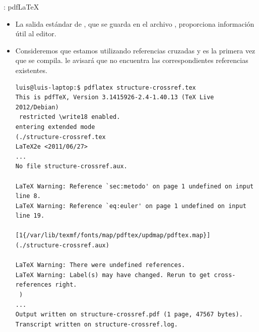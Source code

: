 \documentclass{beamer}
\begin{document}
\begin{frame}[fragile]{\insertsection: pdf\LaTeX{}}
  \begin{itemize}
  \item La salida estándar de , que se guarda en el
    archivo , proporciona información útil al editor. 
  \item Consideremos que estamos utilizando referencias cruzadas y es
    la primera vez que se compila.  le avisará que no
    encuentra las correspondientes referencias existentes.
    \begin{center}
      \begin{verbatim}
luis@luis-laptop:$ pdflatex structure-crossref.tex 
This is pdfTeX, Version 3.1415926-2.4-1.40.13 (TeX Live 2012/Debian)
 restricted \write18 enabled.
entering extended mode
(./structure-crossref.tex
LaTeX2e <2011/06/27>
...
No file structure-crossref.aux.

LaTeX Warning: Reference `sec:metodo' on page 1 undefined on input line 8.
LaTeX Warning: Reference `eq:euler' on page 1 undefined on input line 19.

[1{/var/lib/texmf/fonts/map/pdftex/updmap/pdftex.map}]
(./structure-crossref.aux)

LaTeX Warning: There were undefined references.
LaTeX Warning: Label(s) may have changed. Rerun to get cross-references right.
 )
...
Output written on structure-crossref.pdf (1 page, 47567 bytes).
Transcript written on structure-crossref.log.
      \end{verbatim}
    \end{center}
  \end{itemize}
\end{frame}
\end{document}
